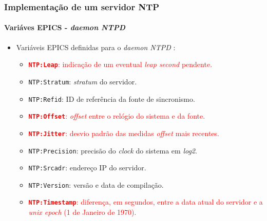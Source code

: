 \begin{frame}
\frametitle{Implementação de um servidor NTP}
\framesubtitle{Variáves EPICS - \textit{daemon NTPD}}

\begin{itemize}
  \item Variáveis EPICS definidas para o \textit{daemon NTPD} :
  
  \vspace{12pt}
  
	\begin{itemize}
	\item  \textcolor{red}{\textbf{\texttt{NTP:Leap}}: indicação de um eventual
	\textit{leap second} pendente.}
	\item \texttt{NTP:Stratum}: \textit{stratum} do servidor.
	\item \texttt{NTP:Refid}: ID de referência da fonte de sincronismo.
	\item \textcolor{red}{\textbf{\texttt{NTP:Offset}}: \textit{offset} entre o
	relógio do sistema e da fonte.}
	\item \textcolor{red}{\textbf{\texttt{NTP:Jitter}}: desvio padrão das medidas
	\textit{offset} mais recentes.}
	\item \texttt{NTP:Precision}: precisão do \textit{clock} do sistema em \textit{log2}.
	\item \texttt{NTP:Srcadr}: endereço IP do servidor. 			
	\item \texttt{NTP:Version}: versão e data de compilação.
	\item \textcolor{red}{\textbf{\texttt{NTP:Timestamp}}: diferença, em segundos,
	entre a data atual do servidor e a \textit{unix epoch} (1 de Janeiro de 1970).}
	\end{itemize}	    
\end{itemize}	

\end{frame}

